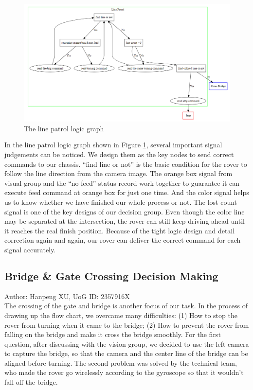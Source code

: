 \begin{figure}[htbp]
    \centering
    \includegraphics[width=14cm]{implementation/img_zijian/line_patrol.png}
    \caption{The line patrol logic graph}
    \label{fig:line_patrol}
\end{figure}

In the line patrol logic graph shown in Figure \ref{fig:line_patrol}, several important signal judgements can be noticed. We design them as the key nodes to send correct commands to our chassis. “find line or not” is the basic condition for the rover to follow the line direction from the camera image. The orange box signal from visual group and the “no feed” status record work together to guarantee it can execute feed command at orange box for just one time. And the color signal helps us to know whether we have finished our whole process or not. The lost count signal is one of the key designs of our decision group. Even though the color line may be separated at the intersection, the rover can still keep driving ahead until it reaches the real finish position. Because of the tight logic design and detail correction again and again, our rover can deliver the correct command for each signal accurately.

\subsection{Bridge \& Gate Crossing Decision Making}
Author: Hanpeng XU, UoG ID: 2357916X\\

The crossing of the gate and bridge is another focus of our task. In the process of drawing up the flow chart, we overcame many difficulties: (1) How to stop the rover from turning when it came to the bridge; (2) How to prevent the rover from falling on the bridge and make it cross the bridge smoothly. For the first question, after discussing with the vision group, we decided to use the left camera to capture the bridge, so that the camera and the center line of the bridge can be aligned before turning. The second problem was solved by the technical team, who made the rover go wirelessly according to the gyroscope so that it wouldn't fall off the bridge.

